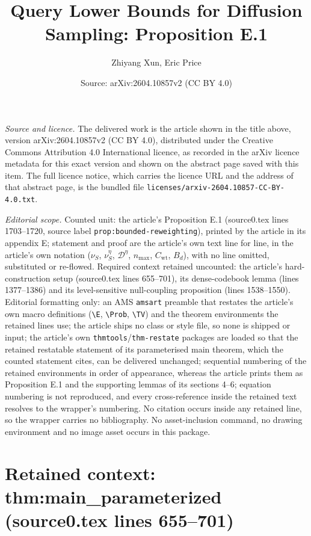 \documentclass[10pt,a4paper]{amsart}
\title[Query Lower Bounds for Diffusion Sampling]{Query Lower Bounds for Diffusion Sampling: Proposition E.1}
\author{Zhiyang Xun, Eric Price}
\date{Source: arXiv:2604.10857v2 (CC BY 4.0)}
\theoremstyle{plain}
\theoremstyle{definition}
\theoremstyle{remark}
\begin{document}
\maketitle

\noindent\emph{Source and licence.} The delivered work is the article shown in the title above, version arXiv:2604.10857v2 (CC BY 4.0), distributed under the Creative Commons Attribution 4.0 International licence, as recorded in the arXiv licence metadata for this exact version and shown on the abstract page saved with this item. The full licence notice, which carries the licence URL and the address of that abstract page, is the bundled file \texttt{licenses/arxiv-2604.10857-CC-BY-4.0.txt}.\par\smallskip

\noindent\textit{Editorial scope.} Counted unit: the article's Proposition E.1 (source0.tex lines 1703--1720, source label \texttt{prop:bounded-reweighting}), printed by the article in its appendix E; statement and proof are the article's own text line for line, in the article's own notation ($\nu_S$, $\nu^\eta_S$, $\mathcal D^\eta$, $n_{\max}$, $C_{\mathrm{wt}}$, $B_d$), with no line omitted, substituted or re-flowed. Required context retained uncounted: the article's hard-construction setup (source0.tex lines 655--701), its dense-codebook lemma (lines 1377--1386) and its level-sensitive null-coupling proposition (lines 1538--1550). Editorial formatting only: an AMS \texttt{amsart} preamble that restates the article's own macro definitions (\texttt{\textbackslash E}, \texttt{\textbackslash Prob}, \texttt{\textbackslash TV}) and the theorem environments the retained lines use; the article ships no class or style file, so none is shipped or input; the article's own \texttt{thmtools}/\texttt{thm-restate} packages are loaded so that the retained restatable statement of its parameterised main theorem, which the counted statement cites, can be delivered unchanged; sequential numbering of the retained environments in order of appearance, whereas the article prints them as Proposition E.1 and the supporting lemmas of its sections 4--6; equation numbering is not reproduced, and every cross-reference inside the retained text resolves to the wrapper's numbering. No citation occurs inside any retained line, so the wrapper carries no bibliography. No asset-inclusion command, no drawing environment and no image asset occurs in this package.


\section*{Retained context: thm:main\_parameterized (source0.tex lines 655--701)}
\end{document}
